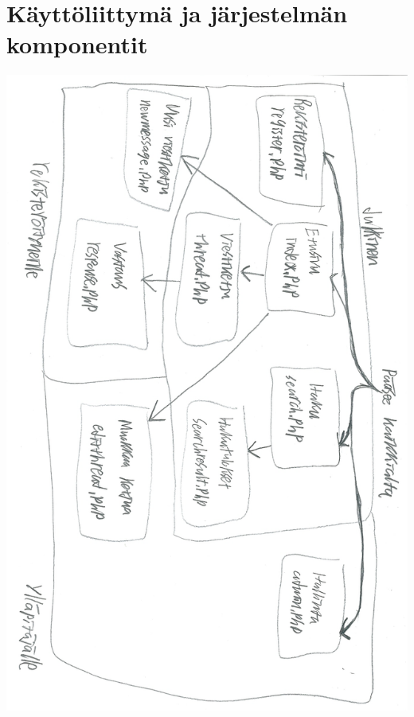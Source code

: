 \documentclass[a4paper, 12pt, finnish]{article}
\begin{document}
\section{Käyttöliittymä ja järjestelmän komponentit}
\includegraphics[width=\textwidth,height=\textheight,keepaspectratio]{kayttoliittyma.png}
\end{document}

